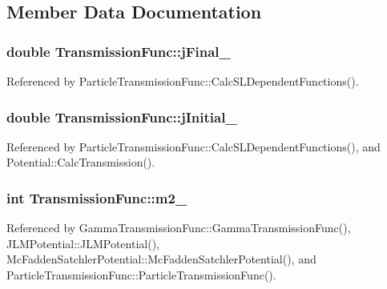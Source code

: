 \subsection{Member Data Documentation}
\hypertarget{classTransmissionFunc_a072b880c86bd5bba59867017e22baf27}{
\subsubsection[{j\-Final\-\_\-}]{\setlength{\rightskip}{0pt plus 5cm}double Transmission\-Func\-::j\-Final\-\_\-\hspace{0.3cm}{\ttfamily [protected]}}}\label{classTransmissionFunc_a072b880c86bd5bba59867017e22baf27}


Referenced by Particle\-Transmission\-Func\-::\-Calc\-S\-L\-Dependent\-Functions().

\hypertarget{classTransmissionFunc_aee6491ab4e09695bc11d1f2e1d5bbc7b}{
\subsubsection[{j\-Initial\-\_\-}]{\setlength{\rightskip}{0pt plus 5cm}double Transmission\-Func\-::j\-Initial\-\_\-\hspace{0.3cm}{\ttfamily [protected]}}}\label{classTransmissionFunc_aee6491ab4e09695bc11d1f2e1d5bbc7b}


Referenced by Particle\-Transmission\-Func\-::\-Calc\-S\-L\-Dependent\-Functions(), and Potential\-::\-Calc\-Transmission().

\hypertarget{classTransmissionFunc_a67cef3345cf8acb114f843cf151bc787}{
\subsubsection[{m2\-\_\-}]{\setlength{\rightskip}{0pt plus 5cm}int Transmission\-Func\-::m2\-\_\-\hspace{0.3cm}{\ttfamily [protected]}}}\label{classTransmissionFunc_a67cef3345cf8acb114f843cf151bc787}


Referenced by Gamma\-Transmission\-Func\-::\-Gamma\-Transmission\-Func(), J\-L\-M\-Potential\-::\-J\-L\-M\-Potential(), Mc\-Fadden\-Satchler\-Potential\-::\-Mc\-Fadden\-Satchler\-Potential(), and Particle\-Transmission\-Func\-::\-Particle\-Transmission\-Func().


